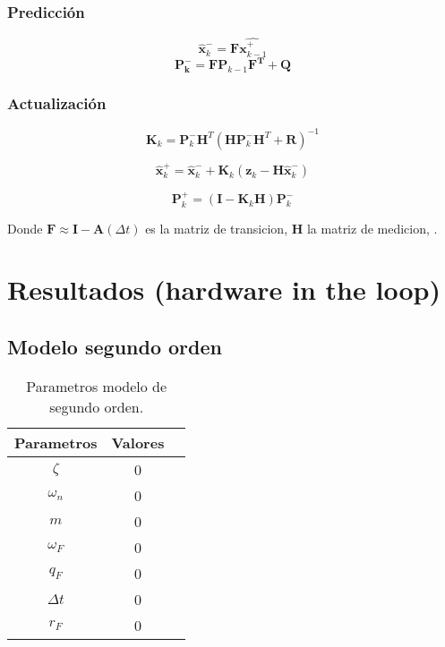 \documentclass[conference]{IEEEtran}
\begin{document}
\subsubsection{Predicci\'on}


\[
\hat{\mathbf{x}}_k^- = \mathbf{F}\hat{\mathbf{x}^+_{k-1}}
\]
\[
\mathbf{P^-_k} = \mathbf{F} \mathbf{P}_{k-1} \mathbf{F^T} + \mathbf{Q}
\]

\subsubsection{Actualizaci\'on}

\[
\mathbf{K}_k = \mathbf{P}_k^- \mathbf{H}^T \left( \mathbf{H} \mathbf{P}_k^- \mathbf{H}^T + \mathbf{R} \right)^{-1}
\]

\[
\hat{\mathbf{x}}_k^+ = \hat{\mathbf{x}}_k^- + \mathbf{K}_k \left( \mathbf{z}_k - \mathbf{H} \hat{\mathbf{x}}_k^- \right)
\]

\[
\mathbf{P}_k^+ = \left( \mathbf{I} - \mathbf{K}_k \mathbf{H} \right) \mathbf{P}_k^-
\]

Donde $\mathbf{F}\approx \mathbf{I} - \mathbf{A}(\Delta t) $ es la matriz de transicion, $\mathbf{H}$  la matriz de medicion, .





\section{Resultados (hardware in the loop)}

\subsection{Modelo segundo orden}

\begin{table}[h]
	\centering
	\caption{Parametros modelo de segundo orden.}
	\label{tab:parametros_segundo_orden}
	\begin{tabular}{|c|c|c|}
		\hline
		\textbf{Parametros} & \textbf{Valores} \\
		\hline
		$\zeta$  &  0 \\
		$\omega_n$      & 0 \\
		$m$ & 0 \\
		$\omega_F$ & 0 \\
		$ q_F $  &  0\\
		$\Delta t$ & 0\\  
		$r_F$ & 0 \\ 
		\hline
	\end{tabular}
	
\end{table}
\end{document}
